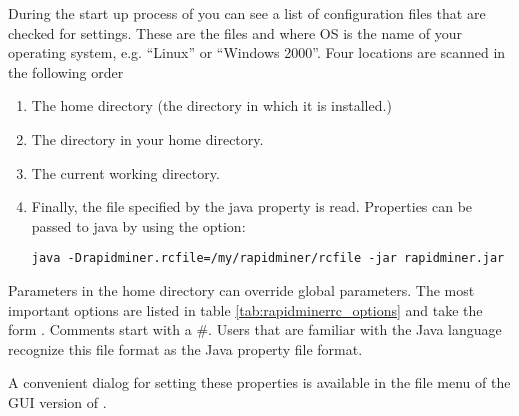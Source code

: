 During the start up process of \rapidminer you can see a list of configuration
files that are checked for settings. These are the files  and
 where OS is the name of your operating system,
e.g. ``Linux'' or ``Windows 2000''. Four locations are scanned in
the following order
\begin{enumerate}
\item The \rapidminer home directory (the directory in which it is installed.)
\item The directory  in your home directory.
\item The current working directory.
\item Finally, the file specified by the java property
   is read. Properties can be passed to java by
  using the  option: 
  \begin{verbatim}
java -Drapidminer.rcfile=/my/rapidminer/rcfile -jar rapidminer.jar
  \end{verbatim}
\end{enumerate}
Parameters in the home directory can override global parameters.
The most important options are listed in table \ref{tab:rapidminerrc_options} and take the
form . Comments start with a \#. Users that are
familiar with the Java language recognize this file format as the Java
property file format.

A convenient dialog for setting these properties is available in the file menu
of the GUI version of \rapidminer.

